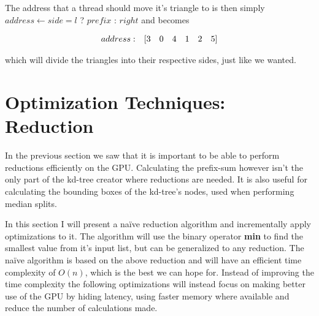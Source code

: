 The address that a thread should move it's triangle to is then simply
$address \leftarrow side = l$ ? $prefix$ : $right$ and becomes


\begin{displaymath}
  \begin{array} {r r r r r r r}
    address: & [3 & 0 & 4 & 1 & 2 & 5]
  \end{array}
\end{displaymath}

which will divide the triangles into their respective sides, just like
we wanted.










\section{Optimization Techniques: Reduction}\label{sec:reduce}


In the previous section we saw that it is important to be able to
perform reductions efficiently on the GPU. Calculating the prefix-sum
however isn't the only part of the kd-tree creator where reductions
are needed. It is also useful for calculating the bounding boxes of
the kd-tree's nodes, used when performing median splits.

In this section I will present a naïve reduction algorithm and
incrementally apply optimizations to it. The algorithm will use the
binary operator \textbf{min} to find the smallest value from it's
input list, but can be generalized to any reduction. The naïve
algorithm is based on the above reduction and will have an efficient
time complexity of $O(n)$, which is the best we can hope for. Instead
of improving the time complexity the following optimizations will
instead focus on making better use of the GPU by hiding latency, using
faster memory where available and reduce the number of calculations
made.

